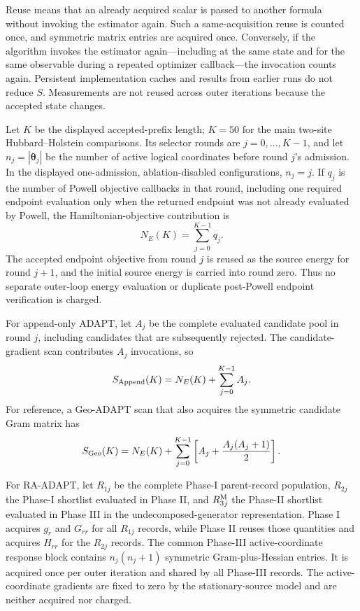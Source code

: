 \documentclass[
  reprint,
  amsmath,
  amssymb,
  aps,
  pra,
  nofootinbib,
  superscriptaddress,
  floatfix
]{revtex4-2}
\begin{document}
Reuse means that an already acquired scalar is passed to another formula
without invoking the estimator again. Such a same-acquisition reuse is counted
once, and symmetric matrix entries are acquired once. Conversely, if the
algorithm invokes the estimator again---including at the same state and for
the same observable during a repeated optimizer callback---the invocation
counts again. Persistent implementation caches and results from earlier runs
do not reduce \(S\). Measurements are not reused across outer
iterations because the accepted state changes.

Let \(K\) be the displayed accepted-prefix length; \(K=50\) for the main
two-site Hubbard--Holstein comparisons. Its selector rounds are
\(j=0,\ldots,K-1\), and let
\(n_j=|\boldsymbol\theta_j|\) be the number of active logical coordinates
before round \(j\)'s admission. In the displayed one-admission,
ablation-disabled configurations, \(n_j=j\). If \(q_j\) is the number of
Powell objective callbacks in that round, including one required endpoint
evaluation only when the returned endpoint was not already evaluated by
Powell, the Hamiltonian-objective contribution is
\begin{equation}
N_E(K)
=
\sum_{j=0}^{K-1}q_j.
\label{eq:appendix_hamiltonian_objective_work}
\end{equation}
The accepted endpoint objective from round \(j\) is reused as the source energy
for round \(j+1\), and the initial source energy is carried into round zero.
Thus no separate outer-loop energy evaluation or duplicate post-Powell endpoint
verification is charged.

For append-only ADAPT, let \(A_j\) be the complete evaluated candidate pool in
round \(j\), including candidates that are subsequently rejected. The
candidate-gradient scan contributes \(A_j\) invocations, so
\begin{equation}
S_{\rm Append}(K)
=
N_E(K)+\sum_{j=0}^{K-1}A_j.
\label{eq:appendix_s_append}
\end{equation}
For reference, a Geo-ADAPT scan that also acquires the symmetric candidate
Gram matrix has
\begin{equation}
S_{\rm Geo}(K)
=
N_E(K)+\sum_{j=0}^{K-1}
\left[
A_j+\frac{A_j(A_j+1)}{2}
\right].
\label{eq:appendix_s_geo}
\end{equation}

For RA-ADAPT, let \(R_{1j}\) be the complete Phase-I parent-record population,
\(R_{2j}\) the Phase-I shortlist evaluated in Phase II, and \(R_{3j}^{\rm M}\)
the Phase-II shortlist evaluated in Phase III in the undecomposed-generator
representation.
Phase I acquires \(g_r\) and \(G_{rr}\) for all \(R_{1j}\) records, while
Phase II reuses those quantities and acquires \(H_{rr}\) for the
\(R_{2j}\) records. The common Phase-III active-coordinate response block contains
\(n_j(n_j+1)\) symmetric Gram-plus-Hessian entries. It is acquired once per
outer iteration and shared by all Phase-III records. The active-coordinate
gradients are fixed to zero by the stationary-source model and are neither
acquired nor charged.
\end{document}

